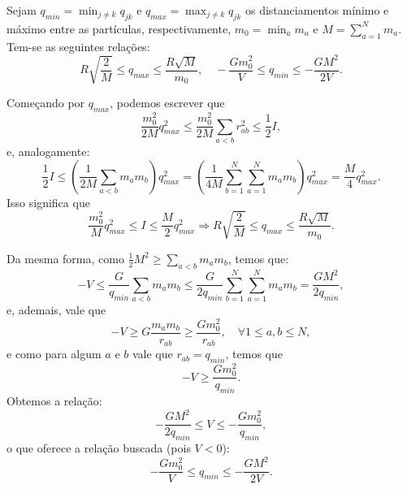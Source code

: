 \begin{theorem}\label{teorema:distanciamento}
    Sejam $q_{min} = \min_{j \neq k} q_{jk}$ e $q_{max} = \max_{j \neq k} q_{jk}$ os distanciamentos mínimo e máximo entre as partículas, respectivamente, $m_0 = \min_a m_a$ e $M = \sum_{a=1}^{N} m_a$. Tem-se as seguintes relações:
    \begin{equation*}
        R \sqrt{\dfrac{2}{M}} \leq q_{max} \leq \dfrac{R \sqrt{M}}{m_0},
        \quad
        - \dfrac{G m_0^2}{V} \leq q_{min} \leq - \dfrac{G M^2}{2 V}.
    \end{equation*}
\end{theorem}
\begin{Proof}
     Começando por $q_{max}$, podemos escrever que
    \begin{equation}
        \dfrac{m_0^2}{2 M} q_{max}^2
        \leq
        \dfrac{m_0^2}{2 M} \sum_{a < b} r_{ab}^2
        \leq
        \dfrac{1}{2} I,
    \end{equation}
    e, analogamente:
    \begin{equation}
    \dfrac{1}{2} I \leq \left( \dfrac{1}{2 M} \sum_{a < b} m_a m_b \right) q_{max}^2 
    = \left( \dfrac{1}{4 M} \sum_{b=1}^{N} \sum_{a=1}^{N} m_a m_b \right ) q_{max}^2
    = \dfrac{M}{4} q_{max}^2. 
    \end{equation}
    Isso significa que
    \begin{equation}
        \dfrac{m_0^2}{M} q_{max}^2 \leq I \leq \dfrac{M}{2} q_{max}^2 
        \Rightarrow
        R \sqrt{\dfrac{2}{M}} \leq q_{max} \leq \dfrac{R\sqrt{M}}{m_0}.
    \end{equation}

    Da mesma forma, como $\frac{1}{2} M^2 \geq \sum_{a<b} m_a m_b$, temos que:
    \begin{equation}
        -V \leq \dfrac{G}{q_{min}} \sum_{a < b} m_a m_b \leq \dfrac{G}{2q_{min}} \sum_{b=1}^{N} \sum_{a=1}^{N} m_a m_b = \dfrac{G M^2}{2 q_{min}},
    \end{equation}
    e, ademais, vale que
    \begin{equation}
        -V \geq G \dfrac{m_a m_b}{r_{ab}} \geq \dfrac{G m_0^2}{r_{ab}}, \quad \forall 1 \leq a,b \leq N,
    \end{equation}
    e como para algum $a$ e $b$ vale que $r_{ab} = q_{min}$, temos que
    \begin{equation}
        -V \geq \dfrac{G m_0^2}{q_{min}}.
    \end{equation}
    Obtemos a relação:
    \begin{equation}
        - \dfrac{G M^2}{2 q_{min}} \leq V \leq - \dfrac{G m_0^2}{q_{min}},
    \end{equation}
    o que oferece a relação buscada (pois $V < 0$):
    \begin{equation}
        - \dfrac{G m_0^2}{V} \leq q_{min} \leq - \dfrac{G M^2}{2 V}.
    \end{equation}
\end{Proof}

